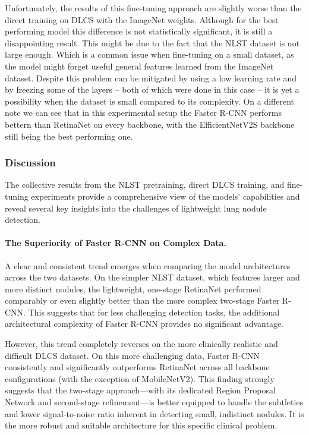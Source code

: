 

Unfortunately, the results of this fine-tuning approach are slightly worse than the direct training on DLCS with the ImageNet weights. Although for the best performing model this difference is not statistically significant, it is still a disappointing result.
This might be due to the fact that the NLST dataset is not large enough. Which is a common issue when fine-tuning on a small dataset, as the model might forget useful general features learned from the ImageNet dataset. Despite this problem can be mitigated by using a low learning rate and by freezing some of the layers -- both of which were done in this case -- it is yet a possibility when the dataset is small compared to its complexity. 
On a different note we can see that in this experimental setup the Faster R-CNN performs bettern than RetinaNet on every backbone, with the EfficientNetV2S backbone still being the best performing one.

\subsubsection{Discussion}

The collective results from the NLST pretraining, direct DLCS training, and fine-tuning experiments provide a comprehensive view of the models' capabilities and reveal several key insights into the challenges of lightweight lung nodule detection.

\paragraph{The Superiority of Faster R-CNN on Complex Data.}
A clear and consistent trend emerges when comparing the model architectures across the two datasets. On the simpler NLST dataset, which features larger and more distinct nodules, the lightweight, one-stage RetinaNet performed comparably or even slightly better than the more complex two-stage Faster R-CNN. This suggests that for less challenging detection tasks, the additional architectural complexity of Faster R-CNN provides no significant advantage.

However, this trend completely reverses on the more clinically realistic and difficult DLCS dataset. On this more challenging data, Faster R-CNN consistently and significantly outperforms RetinaNet across all backbone configurations (with the exception of MobileNetV2). This finding strongly suggests that the two-stage approach—with its dedicated Region Proposal Network and second-stage refinement—is better equipped to handle the subtleties and lower signal-to-noise ratio inherent in detecting small, indistinct nodules. It is the more robust and suitable architecture for this specific clinical problem.

